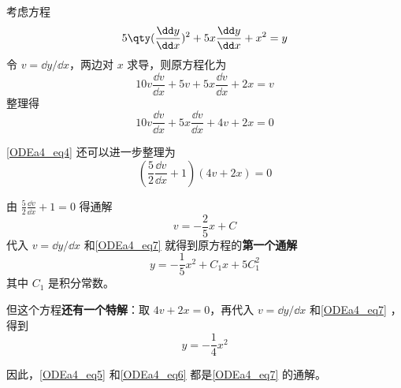 \begin{example}{}\label{ODEa4_ex1}
考虑方程
\begin{equation}\label{ODEa4_eq7}
5\qty(\frac{\dd y}{\dd x})^2+5x\frac{\dd y}{\dd x}+x^2=y
\end{equation}
令 $v=\dd y/\dd x$，两边对 $x$ 求导，则原方程化为
\begin{equation}\label{ODEa4_eq8}
10v\frac{\dd v}{\dd x}+5v+5x\frac{\dd v}{\dd x}+2x=v
\end{equation}
整理得
\begin{equation}\label{ODEa4_eq4}
10v\frac{\dd v}{\dd x}+5x\frac{\dd v}{\dd x}+4v+2x=0
\end{equation}

\autoref{ODEa4_eq4} 还可以进一步整理为
\begin{equation}
(\frac{5}{2}\frac{\dd v}{\dd x}+1)(4v+2x)=0
\end{equation}

由 $\frac{5}{2}\frac{\dd v}{\dd x}+1=0$ 得通解
\begin{equation}\label{ODEa4_eq9}
v=-\frac{2}{5}x+C
\end{equation}
代入 $v=\dd y/\dd x$ 和\autoref{ODEa4_eq7} 就得到原方程的\textbf{第一个通解}
\begin{equation}\label{ODEa4_eq5}
y=-\frac{1}{5}x^2+C_1x+5C_1^2
\end{equation}
其中 $C_1$ 是积分常数。

但这个方程\textbf{还有一个特解}：取 $4v+2x=0$，再代入 $v=\dd y/\dd x$ 和\autoref{ODEa4_eq7} ，得到
\begin{equation}\label{ODEa4_eq6}
y=-\frac{1}{4}x^2
\end{equation}

因此，\autoref{ODEa4_eq5} 和\autoref{ODEa4_eq6} 都是\autoref{ODEa4_eq7} 的通解。




\end{example}

